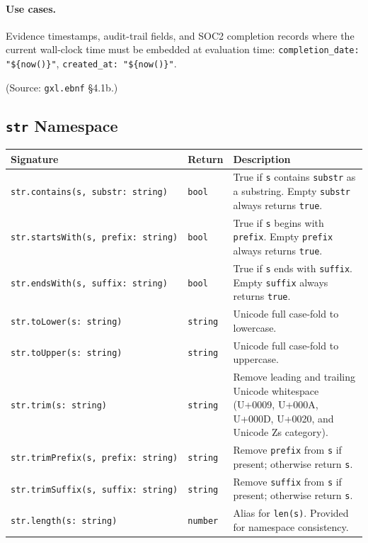 \paragraph{Use cases.}
Evidence timestamps, audit-trail fields, and SOC2 completion records
where the current wall-clock time must be embedded at evaluation time:
\texttt{completion\_date: "\$\{now()\}"}, \texttt{created\_at: "\$\{now()\}"}.

(Source: \texttt{gxl.ebnf} \S4.1b.)

\subsection{\texttt{str} Namespace}
\label{subsec:gxl:stdlib:str}

\begin{center}
\begin{tabular}{p{5.5cm}p{1.5cm}p{6cm}}
\hline
\textbf{Signature} & \textbf{Return} & \textbf{Description} \\
\hline
\texttt{str.contains(s,\ substr:\ string)} & \texttt{bool}
  & True if \texttt{s} contains \texttt{substr} as a substring.
    Empty \texttt{substr} always returns \texttt{true}. \\
\texttt{str.startsWith(s,\ prefix:\ string)} & \texttt{bool}
  & True if \texttt{s} begins with \texttt{prefix}.
    Empty \texttt{prefix} always returns \texttt{true}. \\
\texttt{str.endsWith(s,\ suffix:\ string)} & \texttt{bool}
  & True if \texttt{s} ends with \texttt{suffix}.
    Empty \texttt{suffix} always returns \texttt{true}. \\
\texttt{str.toLower(s:\ string)} & \texttt{string}
  & Unicode full case-fold to lowercase. \\
\texttt{str.toUpper(s:\ string)} & \texttt{string}
  & Unicode full case-fold to uppercase. \\
\texttt{str.trim(s:\ string)} & \texttt{string}
  & Remove leading and trailing Unicode whitespace
    (U+0009, U+000A, U+000D, U+0020, and Unicode Zs category). \\
\texttt{str.trimPrefix(s,\ prefix:\ string)} & \texttt{string}
  & Remove \texttt{prefix} from \texttt{s} if present; otherwise return \texttt{s}. \\
\texttt{str.trimSuffix(s,\ suffix:\ string)} & \texttt{string}
  & Remove \texttt{suffix} from \texttt{s} if present; otherwise return \texttt{s}. \\
\texttt{str.length(s:\ string)} & \texttt{number}
  & Alias for \texttt{len(s)}. Provided for namespace consistency. \\
\hline
\end{tabular}
\end{center}

